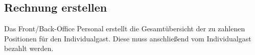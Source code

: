 \documentclass[../SubfileFeatures.tex]{subfiles}
\begin{document}
    \subsection{Rechnung erstellen}
    Das Front/Back-Office Personal erstellt die Gesamtübersicht der zu zahlenen Positionen für den Individualgast.
    Diese muss anschließend vom Individualgast bezahlt werden.
\end{document}
